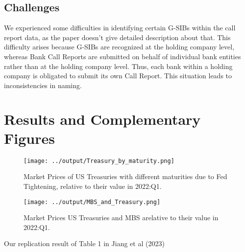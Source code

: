\documentclass{article}
\begin{document}
\subsection{Challenges}

We experienced some difficulties in identifying certain G-SIBs within the call report data, as the paper doesn't give detailed description about that. This difficulty arises because G-SIBs are recognized at the holding company level, whereas Bank Call Reports are submitted on behalf of individual bank entities rather than at the holding company level. Thus, each bank within a holding company is obligated to submit its own Call Report. This situation leads to inconsistencies in naming.

\section{Results and Complementary Figures}


\begin{figure}[h]
\centering
\texttt{[image: ../output/Treasury\_by\_maturity.png]}
\caption{\label{fig:myplot1}Market Prices of US Treasuries with different maturities due to Fed Tightening, relative to their value in 2022:Q1.}
\end{figure}

\begin{figure}[h]
\centering
\texttt{[image: ../output/MBS\_and\_Treasury.png]}
\caption{\label{fig:myplot2}Market Prices US Treasuries and MBS arelative to their value in 2022:Q1.}
\end{figure}



\begin{table}

\centering

\caption{Our replication result of Table 1 in Jiang et al (2023)}
\label{table:Table1.tex}
\end{table}
\end{document}
